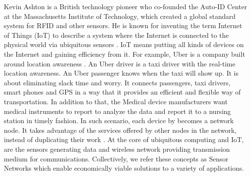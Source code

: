 	Kevin Ashton is a British technology pioneer who co-founded the Auto-ID Center at the Massachusetts Institute of Technology, which created a global standard system for RFID and other sensors.
	He is known for inventing the term Internet of Things (IoT) to describe a system where the Internet is connected to the physical world via ubiquitous sensors \cite{ashton2009internet}.
	IoT means putting all kinds of devices on the Internet and gaining efficiency from it. 
	For example, Uber is a company built around location awareness \cite{Uber}.
	An Uber driver is a taxi driver with the real-time location awareness.
	An Uber passenger knows when the taxi will show up.
	It is about eliminating slack time and worry.
	It connects passengers, taxi drivers, smart phones and GPS in a way that it provides an efficient and flexible way of transportation.
	In addition to that, the Medical device manufacturers want medical instruments to report to analyze the data and report it to a nursing station in timely fashion. 
	In such scenario, each device by becomes a network node.
	It takes advantage of the services offered by other nodes in the network, instead of duplicating their work \cite{2002-Stajano-ubiquitous}.
	At the core of ubiquitous computing and IoT, are the sensors generating data and wireless network providing transmission medium for communications. 
	Collectively, we refer these concepts as Sensor Networks which enable economically viable solutions to a variety of applications.


